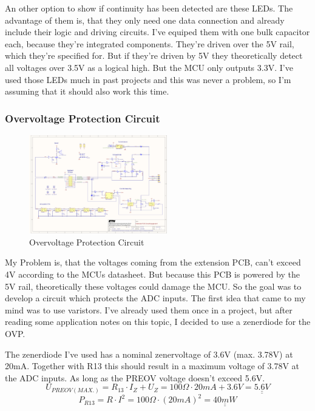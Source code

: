 An other option to show if continuity has been detected are these LEDs. The advantage of them is, that they only need one data connection and already include their logic and driving circuits. I've equiped them with one bulk capacitor each, because they're integrated components. They're driven over the 5V rail, which they're specified for. But if they're driven by 5V they theoretically detect all voltages over 3.5V as a logical high. But the MCU only outputs 3.3V. I've used those LEDs much in past projects and this was never a problem, so I'm assuming that it should also work this time.



\subsubsection{Overvoltage Protection Circuit}

\begin{figure}[H]
	\centering
	\includegraphics[width=6cm, trim={17cm 9.5cm 19cm 15.5cm}, clip]{../../../5_Hardware/PCB_EXTENSION_CircuitVoyager_pre1/Project Outputs for PCB_EXT_CV_PRE1/Schematic_PCB_EXTENSION_CircuitVoyager_pre1.pdf}
	\caption{Overvoltage Protection Circuit}
	\label{fig:Overvoltage Protection Circuit}
\end{figure}

My Problem is, that the voltages coming from  the extension PCB, can't exceed 4V according to the MCUs datasheet. But because this PCB is powered by the 5V rail, theoretically these voltages could damage the MCU. So the goal was to develop a circuit which protects the ADC inputs. The first idea that came to my mind was to use varistors. I've already used them once in a project, but after reading some application notes on this topic, I decided to use a zenerdiode for the OVP. \cite{Protecting_ADC_Inputs_AN}

The zenerdiode I've used has a nominal zenervoltage of 3.6V (max. 3.78V) at 20mA. Together with R13 this should result in a maximum voltage of 3.78V at the ADC inputs. As long as the PREOV voltage doesn't exceed 5.6V.
\[U_{PREOV(MAX.)} = R_{13} \cdot I_Z + U_Z = 100\Omega \cdot 20mA + 3.6V = \underline{\underline{5.6V}}\]
\[P_{R13} = R \cdot I^2 = 100\Omega \cdot (20mA)^2 = \underline{\underline{40mW}}\]


